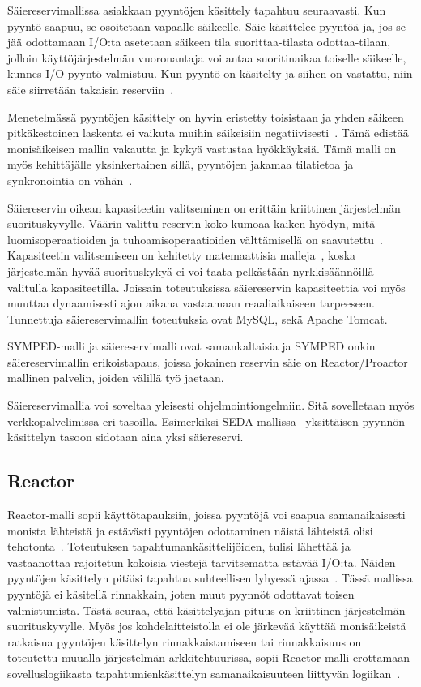 \documentclass[finnish]{tktltiki2}
\theoremstyle{definition}
\theoremstyle{remark}
\begin{document}
Säiereservimallissa asiakkaan pyyntöjen käsittely tapahtuu seuraavasti.
Kun pyyntö saapuu, se osoitetaan vapaalle säikeelle. Säie käsittelee pyyntöä ja,
jos se jää odottamaan I/O:ta asetetaan säikeen tila suorittaa-tilasta odottaa-tilaan,
jolloin käyttöjärjestelmän vuoronantaja voi antaa suoritinaikaa toiselle säikeelle,
kunnes I/O-pyyntö valmistuu. Kun pyyntö on käsitelty ja siihen on vastattu, niin
säie siirretään takaisin reserviin~\cite{ling_analysis_2000}.

Menetelmässä pyyntöjen käsittely on hyvin eristetty toisistaan ja
yhden säikeen pitkäkestoinen laskenta ei vaikuta muihin säikeisiin negatiivisesti~\cite{davis_case_2017}.
Tämä edistää monisäikeisen mallin vakautta ja kykyä vastustaa hyökkäyksiä.
Tämä malli on myös kehittäjälle yksinkertainen sillä, pyyntöjen jakamaa tilatietoa
ja synkronointia on vähän~\cite{hu_applying_1998}.

Säiereservin oikean kapasiteetin valitseminen on erittäin kriittinen
järjestelmän suorituskyvylle.
Väärin valittu reservin koko kumoaa kaiken hyödyn, mitä luomisoperaatioiden
ja tuhoamisoperaatioiden välttämisellä on saavutettu~\cite{ling_analysis_2000}.
Kapasiteetin valitsemiseen on kehitetty matemaattisia malleja~\cite{ling_analysis_2000},
koska järjestelmän hyvää suorituskykyä ei voi taata pelkästään nyrkkisäännöillä
valitulla kapasiteetilla.
Joissain toteutuksissa säiereservin kapasiteettia voi myös muuttaa dynaamisesti ajon aikana vastaamaan
reaaliaikaiseen tarpeeseen.
Tunnettuja säiereservimallin toteutuksia ovat MySQL, sekä Apache Tomcat.

SYMPED-malli ja säiereservimalli ovat samankaltaisia ja SYMPED onkin
säiereservimallin erikoistapaus, joissa jokainen reservin säie on
Reactor/Proactor mallinen palvelin,
joiden välillä työ jaetaan.

Säiereservimallia voi soveltaa yleisesti ohjelmointiongelmiin. Sitä
sovelletaan myös verkkopalvelimissa eri tasoilla. Esimerkiksi
SEDA-mallissa~\cite{welsh_seda_2001}
yksittäisen pyynnön käsittelyn tasoon sidotaan aina yksi säiereservi.

\subsection{Reactor}

Reactor-malli sopii käyttötapauksiin, joissa pyyntöjä voi saapua
samanaikaisesti monista lähteistä ja estävästi
pyyntöjen odottaminen näistä lähteistä olisi tehotonta~\cite{schmidt_reactor:_1995}.
Toteutuksen tapahtumankäsittelijöiden, tulisi
lähettää ja vastaanottaa rajoitetun kokoisia viestejä
tarvitsematta estävää I/O:ta.
Näiden pyyntöjen käsittelyn
pitäisi tapahtua suhteellisen lyhyessä ajassa~\cite{schmidt_reactor:_1995}.
Tässä mallissa pyyntöjä ei käsitellä rinnakkain, joten muut
pyynnöt odottavat toisen valmistumista.
Tästä seuraa, että käsittelyajan pituus on kriittinen järjestelmän
suorituskyvylle.
Myös jos kohdelaitteistolla ei ole järkevää käyttää monisäikeistä
ratkaisua pyyntöjen käsittelyn rinnakkaistamiseen tai rinnakkaisuus
on toteutettu muualla järjestelmän arkkitehtuurissa, sopii Reactor-malli
erottamaan sovelluslogiikasta tapahtumienkäsittelyn
samanaikaisuuteen liittyvän logiikan~\cite{schmidt_reactor:_1995}.
\end{document}
